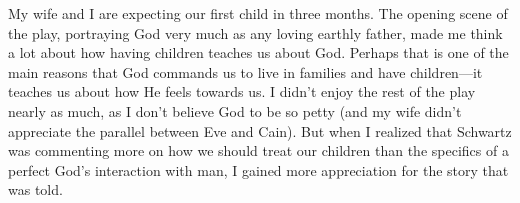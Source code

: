 \documentclass[onecolumn, 12pt]{article}
\begin{document}
My wife and I are expecting our first child in three months.  The opening scene
of the play, portraying God very much as any loving earthly father, made me
think a lot about how having children teaches us about God.  Perhaps that is
one of the main reasons that God commands us to live in families and have
children---it teaches us about how He feels towards us.  I didn't enjoy the
rest of the play nearly as much, as I don't believe God to be so petty (and my
wife didn't appreciate the parallel between Eve and Cain).  But when I realized
that Schwartz was commenting more on how we should treat our children than the
specifics of a perfect God's interaction with man, I gained more appreciation
for the story that was told.
\end{document}
